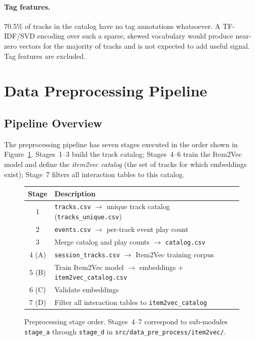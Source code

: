 \documentclass[11pt]{article}
\begin{document}
\paragraph{Tag features.}
70.5\% of tracks in the catalog have no tag annotations whatsoever.
A TF-IDF/SVD encoding over such a sparse, skewed vocabulary would produce
near-zero vectors for the majority of tracks and is not expected to add
useful signal. Tag features are excluded.

\section{Data Preprocessing Pipeline}

\subsection{Pipeline Overview}

The preprocessing pipeline has seven stages executed in the order shown
in Figure~\ref{fig:preproc_overview}. Stages~1--3 build the track catalog;
Stages~4--6 train the Item2Vec model and define the \emph{item2vec catalog}
(the set of tracks for which embeddings exist); Stage~7 filters all
interaction tables to this catalog.

\begin{figure}[H]
\centering
\small
\begin{tabular}{cl}
\textbf{Stage} & \textbf{Description} \\
\midrule
1 & \texttt{tracks.csv} $\to$ unique track catalog (\texttt{tracks\_unique.csv}) \\
2 & \texttt{events.csv} $\to$ per-track event play count \\
3 & Merge catalog and play counts $\to$ \texttt{catalog.csv} \\
4 (A) & \texttt{session\_tracks.csv} $\to$ Item2Vec training corpus \\
5 (B) & Train Item2Vec model $\to$ embeddings + \texttt{item2vec\_catalog.csv} \\
6 (C) & Validate embeddings \\
7 (D) & Filter all interaction tables to \texttt{item2vec\_catalog} \\
\end{tabular}
\caption{Preprocessing stage order. Stages~4--7 correspond to sub-modules
\texttt{stage\_a} through \texttt{stage\_d} in
\texttt{src/data\_pre\_process/item2vec/}.}
\label{fig:preproc_overview}
\end{figure}
\end{document}
